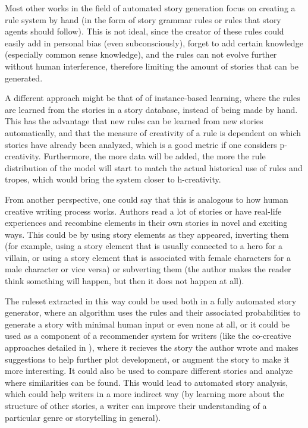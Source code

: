 Most other works in the field of automated story generation focus on creating a
rule system by hand (in the form of story grammar rules or rules that story agents should follow).
This is not ideal, since the creator of these rules could easily add in personal
bias (even subconsciously), forget to add certain knowledge (especially common
sense knowledge), and the rules can not evolve further without human
interference, therefore limiting the amount of stories that can be generated.

A different approach might be that of of instance-based learning, where the
rules are learned from the stories in a story database, instead of
being made by hand. This has
the advantage that new rules can be learned from new stories automatically, and
that the measure of creativity of a rule is dependent on which stories have
already been analyzed,
which is a good metric if one considers p-creativity. Furthermore, the more data
will be added, the more the rule distribution of the model will start to match 
the actual historical use of rules and tropes, which would bring the system closer to
h-creativity.

From another perspective, one could say that this is analogous to how human
creative writing process works. Authors read a lot of stories or have real-life
experiences and recombine elements in their own stories in novel and exciting 
ways. This could be by using story elements as they appeared, inverting them
(for example, using a story element that is usually connected to a hero for a
villain, or using a story element that is associated with female characters for
a male character or vice versa) or subverting them (the author makes the reader
think something will happen, but then it does not happen at all).

The ruleset extracted in this way could be used both in a fully automated story
generator, where an algorithm uses the rules and their associated probabilities
to generate a story with minimal human input or even none at all, or it could be used as a component
of a recommender system for writers (like the co-creative approaches detailed in
\cite{kantosalo2014isolation}), where it recieves the story the author
wrote and makes suggestions to help further plot development, or augment the
story to make it more interesting. It could also be used to compare different
stories and analyze where similarities can be found. This would lead to
automated story analysis, which could help writers in a more indirect way (by
learning more about the structure of other stories, a writer can improve their
understanding of a particular genre or storytelling in general).

